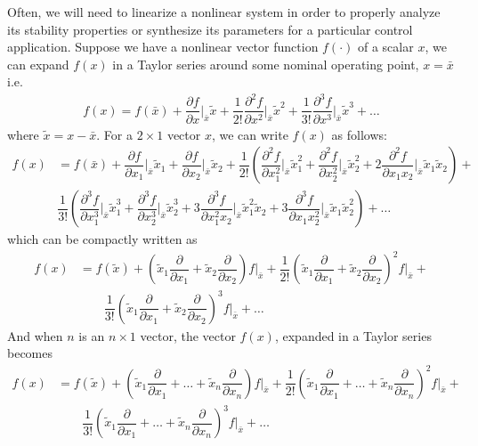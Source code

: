 Often, we will need to linearize a nonlinear system in order to properly analyze its stability properties or synthesize its parameters for a particular control application. Suppose we have a nonlinear vector function $f(\cdot)$ of a scalar $x$, we can expand $f(x)$ in a Taylor series around some nominal operating point, $x = \bar{x}$ i.e.
%
\begin{align}
	f(x) = f(\bar{x}) + \dfrac{\partial f}{\partial x} \bigg\rvert_{\bar{x}} \tilde{x}+ \dfrac{1}{2!} \dfrac{\partial^2f}{\partial x^2} \bigg\rvert_{\bar{x}} \tilde{x}^2 + \dfrac{1}{3!} \dfrac{\partial^3f}{\partial x^3} \bigg\rvert_{\bar{x}} \tilde{x}^3 +  \ldots
\end{align}
%
where $\tilde{x} = x - \bar{x}$. For a $2 \times 1$ vector $x$, we can write $f(x)$ as follows:
%
\begin{align}
	f(x) &= f(\bar{x}) + \dfrac{\partial f}{\partial x_1} \bigg\rvert_{\bar{x}} \tilde{x}_1 + \dfrac{\partial f}{\partial x_2} \bigg\rvert_{\bar{x}} \tilde{x}_2 + \dfrac{1}{2!} \left(\dfrac{\partial^2f}{\partial x_1^2} \bigg\rvert_{\bar{x}} \tilde{x}_1^2 + \dfrac{\partial^2f}{\partial x_2^2} \bigg\rvert_{\bar{x}} \tilde{x}_2^2 + 2 \dfrac{\partial ^2 f}{\partial x_1 x_2}\bigg \rvert_{\bar{x}} \tilde{x}_1 \tilde{x}_2 \right) + \nonumber \\
	& 
	\dfrac{1}{3!} \left(\dfrac{\partial^3f}{\partial x_1^3} \bigg\rvert_{\bar{x}} \tilde{x}_1^3 + \dfrac{\partial^3f}{\partial x_2^3} \bigg\rvert_{\bar{x}} \tilde{x}_2^3 + 3 \dfrac{\partial ^3 f}{\partial x_1^2 x_2}\bigg \rvert_{\bar{x}} \tilde{x}_1^2  \tilde{x}_2 + 3 \dfrac{\partial ^3 f}{\partial x_1 x_2^2}\bigg \rvert_{\bar{x}} \tilde{x}_1  \tilde{x}_2^2  \right) + \ldots
\end{align}
 which can be compactly written as 
 \begin{align}
 	f(x) & = f(\tilde{x}) + \left(\tilde{x}_1 \dfrac{\partial}{\partial x_1} + \tilde{x}_2 \dfrac{\partial}{\partial x_2}\right)f\bigg\rvert_{\bar{x}} +
 	\dfrac{1}{2!} \left(\tilde{x}_1 \dfrac{\partial}{\partial x_1} + \tilde{x}_2 \dfrac{\partial}{\partial x_2}\right)^2f\bigg\rvert_{\bar{x}} + \nonumber \\
 	& 
 	\qquad \dfrac{1}{3!}\left(\tilde{x}_1 \dfrac{\partial}{\partial x_1} + \tilde{x}_2 \dfrac{\partial}{\partial x_2}\right)^3f\bigg\rvert_{\bar{x}} + \ldots
 \end{align}
%
And when $n$ is an $n\times 1$ vector, the vector $f(x)$, expanded in a Taylor series becomes
%
\begin{align}
	f(x) &=  f(\tilde{x}) + \left(\tilde{x}_1 \dfrac{\partial}{\partial x_1} + \ldots + \tilde{x}_n \dfrac{\partial}{\partial x_n}\right)f\bigg\rvert_{\bar{x}} +
	\dfrac{1}{2!} \left(\tilde{x}_1 \dfrac{\partial}{\partial x_1} + \ldots + \tilde{x}_n \dfrac{\partial}{\partial x_n}\right)^2f\bigg\rvert_{\bar{x}} + \nonumber \\
	& 
	\qquad \dfrac{1}{3!}\left(\tilde{x}_1 \dfrac{\partial}{\partial x_1} + \ldots + \tilde{x}_n \dfrac{\partial}{\partial x_n}\right)^3f\bigg\rvert_{\bar{x}} + \ldots
\end{align}
